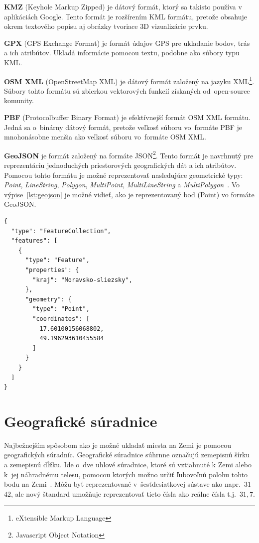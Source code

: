 \textbf{KMZ} (Keyhole Markup Zipped) je dátový formát, ktorý sa takisto používa v aplikáciách Google. Tento formát je rozšírením KML formátu, pretože obsahuje okrem textového popisu aj obrázky tvoriace 3D vizualizácie prvku.

\textbf{GPX} (GPS Exchange Format) je formát údajov GPS pre ukladanie bodov, trás a ich atribútov. Ukladá informácie pomocou textu, podobne ako súbory typu KML.

\textbf{OSM XML} (OpenStreetMap XML) je dátový formát založený na jazyku XML\footnote{eXtensible Markup Language}. Súbory tohto formátu sú zbierkou vektorových funkcií získaných od~open-source komunity.

\textbf{PBF} (Protocolbuffer Binary Format) je efektívnejší formát OSM XML formátu. Jedná sa o~binárny dátový formát, pretože veľkosť súboru vo~formáte PBF je mnohonásobne menšia ako veľkosť súboru vo~formáte OSM XML.

\textbf{GeoJSON} je formát založený na formáte JSON\footnote{Javascript Object Notation}. Tento formát je navrhnutý pre reprezentáciu jednoduchých priestorových geografických dát a ich atribútov. Pomocou tohto formátu je možné reprezentovať nasledujúce geometrické typy: \emph{Point}, \emph{LineString}, \emph{Polygon}, \emph{MultiPoint}, \emph{MultiLineString} a \emph{MultiPolygon}~\cite{rfc7946}. Vo výpise~\ref{lst:geojson} je možné vidieť, ako je reprezentovaný bod (Point) vo formáte GeoJSON.

\begin{lstlisting}
{
  "type": "FeatureCollection",
  "features": [
    {
      "type": "Feature",
      "properties": {
        "kraj": "Moravsko-sliezsky",
      },
      "geometry": {
        "type": "Point",
        "coordinates": [
          17.60100156068802,
          49.196293610455584
        ]
      }
    }
  ]
}
\end{lstlisting}


\section{Geografické súradnice}
Najbežnejším spôsobom ako je možné ukladať miesta na Zemi je pomocou geografických súradníc. Geografické súradnice súhrnne označujú zemepisnú šírku a zemepisnú dĺžku. Ide o~dve uhlové súradnice, ktoré sú vztiahnuté k Zemi alebo k~jej náhradnému telesu, pomocou ktorých možno určiť ľubovoľnú polohu tohto bodu na Zemi~\cite{pyramida1987}. Môžu byť reprezentované v~šesťdesiatkovej sústave ako napr.~$31$\textdegree\, $42$\textquotesingle, ale nový štandard umožňuje reprezentovať tieto čísla ako reálne čísla t.j.~$31,7$.

